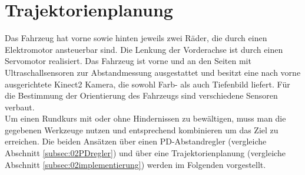 \section{Trajektorienplanung}
\label{sec:trajektorienplanung}
Das Fahrzeug hat vorne sowie hinten jeweils zwei R\"ader, die durch einen Elektromotor ansteuerbar sind. Die Lenkung der Vorderachse ist durch einen Servomotor realisiert. Das Fahrzeug ist vorne und an den Seiten mit Ultraschallsensoren zur Abstandmessung ausgestattet und besitzt eine nach vorne ausgerichtete Kinect2 Kamera, die sowohl Farb- als auch Tiefenbild liefert. F\"ur die Bestimmung der Orientierung des Fahrzeugs sind verschiedene Sensoren verbaut. \\
Um einen Rundkurs mit oder ohne Hindernissen zu bew\"altigen, muss man die gegebenen Werkzeuge nutzen und entsprechend kombinieren um das Ziel zu erreichen. Die beiden Ans\"atzen \"uber einen PD-Abstandregler (vergleiche Abschnitt \ref{subsec:02PDregler}) und \"uber eine Trajektorienplanung (vergleiche Abschnitt \ref{subsec:02implementierung}) werden im Folgenden vorgestellt.







